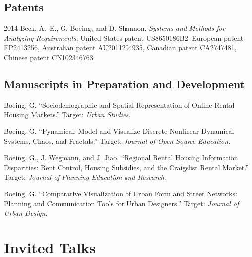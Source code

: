 \documentclass{academiccv}
\begin{document}
\subsection*{Patents}

\begin{tablist}

\item[2014] \tab Beck, A.~E., G. Boeing, and D. Shannon. \textit{Systems and Methods for Analyzing Requirements}. United States patent US8650186B2, European patent EP2413256, Australian patent AU2011204935, Canadian patent CA2747481, Chinese patent CN102346763.

\end{tablist}



\subsection*{Manuscripts in Preparation and Development}

\begin{tablist}

\item[\the\year] \tab Boeing, G. \enquote{Sociodemographic and Spatial Representation of Online Rental Housing Markets.} Target: \textit{Urban Studies}.

\item[\the\year] \tab Boeing, G. \enquote{Pynamical: Model and Visualize Discrete Nonlinear Dynamical Systems, Chaos, and Fractals.} Target: \textit{Journal of Open Source Education}.

\item[\the\year] \tab Boeing, G., J. Wegmann, and J. Jiao. \enquote{Regional Rental Housing Information Disparities: Rent Control, Housing Subsidies, and the Craigslist Rental Market.} Target: \textit{Journal of Planning Education and Research}.

\item[\the\year] \tab Boeing, G. \enquote{Comparative Visualization of Urban Form and Street Networks: Planning and Communication Tools for Urban Designers.} Target: \textit{Journal of Urban Design}.
	
\end{tablist}



\section*{Invited Talks}
\end{document}
